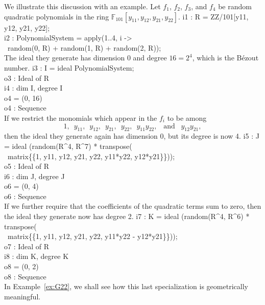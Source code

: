\begin{example}\label{ex:one}
We illustrate this discussion with an example.
Let $f_1$, $f_2$, $f_3$, and $f_4$ be random quadratic polynomials in the ring  
${\mathbb F}_{101}[y_{11},y_{12},y_{21},y_{22}]$.
%
\beginOutput
i1 : R = ZZ/101[y11, y12, y21, y22];\\
\endOutput
%
\beginOutput
i2 : PolynomialSystem = apply(1..4, i -> \\
\                     random(0, R) + random(1, R) + random(2, R));\\
\endOutput
%
The ideal they generate has dimension 0 and degree $16=2^4$, which is the
B\'ezout number. 
%
\beginOutput
i3 : I = ideal PolynomialSystem;\\
\emptyLine
o3 : Ideal of R\\
\endOutput
%
\beginOutput
i4 : dim I, degree I\\
\emptyLine
o4 = (0, 16)\\
\emptyLine
o4 : Sequence\\
\endOutput
%
If we restrict the monomials which appear in the $f_i$ to be among
$$
  1,\;\ y_{11},\;\ y_{12},\;\ y_{21},\;\ y_{22},\;\  
  y_{11}y_{22},\;\ \mbox{ and }\;\  y_{12}y_{21},
$$
then the ideal they generate again has dimension 0, but its degree is now 4.
%
\beginOutput
i5 : J = ideal (random(R^4, R^7) *  transpose(\\
\             matrix\{\{1, y11, y12, y21, y22, y11*y22, y12*y21\}\}));\\
\emptyLine
o5 : Ideal of R\\
\endOutput
%
\beginOutput
i6 : dim J, degree J\\
\emptyLine
o6 = (0, 4)\\
\emptyLine
o6 : Sequence\\
\endOutput
%
If we further require that the coefficients of the
quadratic terms sum to zero, then the ideal they generate now 
has degree 2.
%
\beginOutput
i7 : K = ideal (random(R^4, R^6) * transpose( \\
\             matrix\{\{1, y11, y12, y21, y22, y11*y22 - y12*y21\}\}));\\
\emptyLine
o7 : Ideal of R\\
\endOutput
%
\beginOutput
i8 : dim K, degree K\\
\emptyLine
o8 = (0, 2)\\
\emptyLine
o8 : Sequence\\
\endOutput
%
In Example~\ref{ex:G22}, we shall see how this last specialization is
geometrically meaningful.
\end{example}


